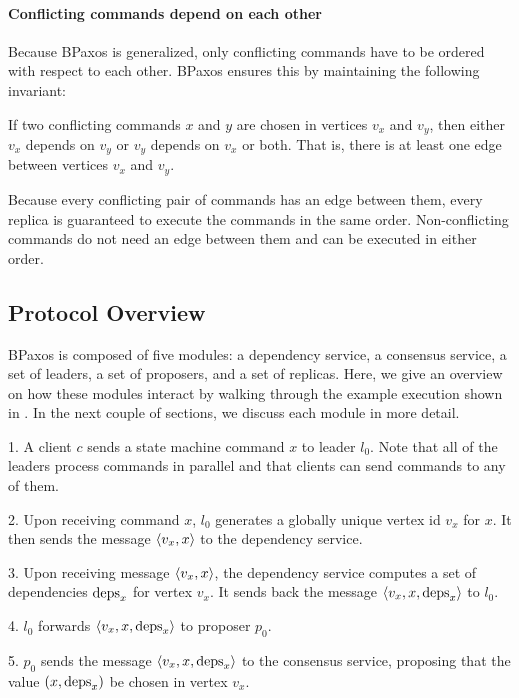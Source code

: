 {}

\paragraph{Conflicting commands depend on each other}
Because BPaxos is generalized, only conflicting commands have to be ordered
with respect to each other. BPaxos ensures this by maintaining the following
invariant:
\begin{invariant}
  If two conflicting commands $x$ and $y$ are chosen in vertices $v_x$ and
  $v_y$, then either $v_x$ depends on $v_y$ or $v_y$ depends on $v_x$ or both.
  That is, there is at least one edge between vertices $v_x$ and $v_y$.
\end{invariant}
Because every conflicting pair of commands has an edge between them, every
replica is guaranteed to execute the commands in the same order.
Non-conflicting commands do not need an edge between them and can be executed
in either order.

\subsection{Protocol Overview}
BPaxos is composed of five modules: a dependency service, a consensus service,
a set of leaders, a set of proposers, and a set of replicas. Here, we give an
overview on how these modules interact by walking through the example execution
shown in . In the next couple of sections, we discuss
each module in more detail.

1. A client $c$ sends a state machine command $x$ to leader $l_0$. Note that
all of the leaders process commands in parallel and that clients can send
commands to any of them.

2. Upon receiving command $x$, $l_0$ generates a globally unique vertex id
$v_x$ for $x$. It then sends the message $\langle v_x, x \rangle$ to the dependency
service.

3. Upon receiving message $\langle v_x, x \rangle$, the dependency service computes a set
of dependencies $\text{deps}_x$ for vertex $v_x$. It sends back the message
$\langle v_x, x, \text{deps}_x \rangle$ to $l_0$.

4. $l_0$ forwards $\langle v_x, x, \text{deps}_x \rangle$ to proposer $p_0$.

5. $p_0$ sends the message $\langle v_x, x, \text{deps}_x \rangle$ to the consensus service,
proposing that the value $(x, \text{deps}_x)$ be chosen in vertex $v_x$.

